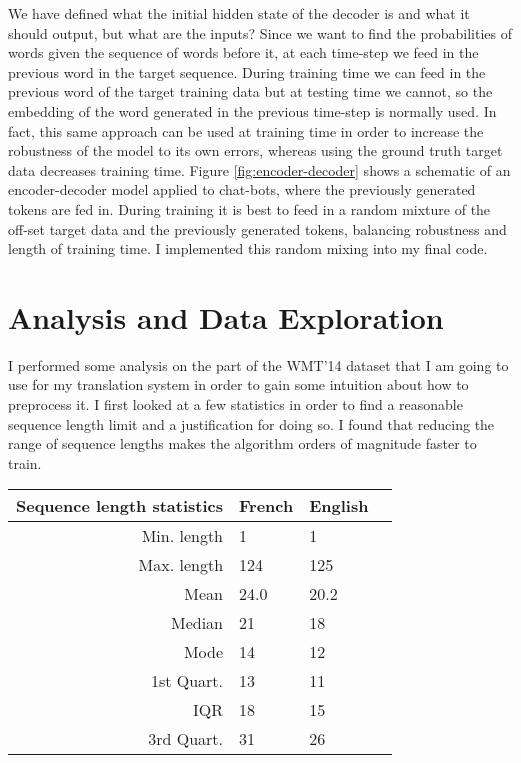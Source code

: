 \documentclass[]{article}
\begin{document}
We have defined what the initial hidden state of the decoder is and what it should output, but what are the inputs? Since we want to find the probabilities of words given the sequence of words before it, at each time-step we feed in the previous word in the target sequence. During training time we can feed in the previous word of the target training data but at testing time we cannot, so the embedding of the word generated in the previous time-step is normally used. In fact, this same approach can be used at training time in order to increase the robustness of the model to its own errors, whereas using the ground truth target data decreases training time. Figure \ref{fig:encoder-decoder} shows a schematic of an encoder-decoder model applied to chat-bots, where the previously generated tokens are fed in. During training it is best to feed in a random mixture of the off-set target data and the previously generated tokens, balancing robustness and length of training time. I implemented this random mixing into my final code. 
\section{Analysis and Data Exploration}
I performed some analysis on the part of the WMT'14 dataset that I am going to use for my translation system in order to gain some intuition about how to preprocess it. I first looked at a few statistics in order to find a reasonable sequence length limit and a justification for doing so. I found that reducing the range of sequence lengths makes the algorithm orders of magnitude faster to train. 
\begin{tabular}{|r|l|l|r|}
	\hline
	Sequence length statistics             & French & English \\\hline
	Min. length  & 1      & 1    \\ \hline
	Max. length  & 124    & 125  \\ \hline
	Mean         & 24.0   & 20.2 \\ \hline
	Median       & 21     & 18   \\ \hline
	Mode         & 14     & 12   \\ \hline
	1st Quart.   & 13     & 11   \\ \hline
	IQR          & 18     & 15  \\ \hline
	3rd Quart.   & 31     & 26   \\ \hline
\end{tabular}
\end{document}
